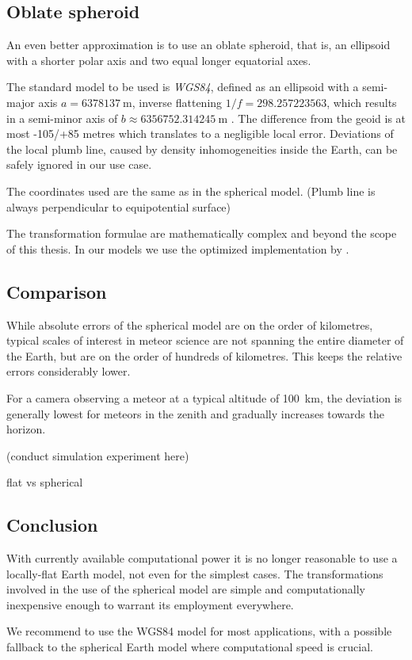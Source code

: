     \subsection{Oblate spheroid} \label{mmw}
        An even better approximation is to use an oblate spheroid,
        that is, an ellipsoid with a shorter polar axis and two
        equal longer equatorial axes.

        The standard model to be used is \emph{WGS84}, defined as an ellipsoid
        with a semi-major axis $a = \SI{6378137}{\metre}$, inverse flattening
        $1/f = \num{298.257223563}$, which results in a semi-minor axis of
        $b \approx \SI{6356752.314245}{\metre}$ \cite{???}.
        The difference from the geoid is at most -105/+85 metres \cite{???}
        which translates to a negligible local error.
        Deviations of the local plumb line, caused by density inhomogeneities
        inside the Earth, can be safely ignored in our use case.

        The coordinates used are the same as in the spherical model. (Plumb line is always perpendicular to equipotential surface)

        The transformation formulae are mathematically complex and beyond the scope of this thesis.
        In our models we use the optimized implementation by \citet{osen2017}.

    \subsection{Comparison} \label{mmc}
        While absolute errors of the spherical model are on the order of kilometres,
        typical scales of interest in meteor science are not spanning the entire diameter of the Earth,
        but are on the order of hundreds of kilometres. This keeps the relative errors considerably lower.

        For a camera observing a meteor at a typical altitude of \SI{100}{\kilo\metre},
        the deviation is generally lowest for meteors in the zenith
        and gradually increases towards the horizon.

        (conduct simulation experiment here)

        flat vs spherical

    \subsection{Conclusion}
        With currently available computational power it is no longer reasonable to
        use a locally-flat Earth model, not even for the simplest cases.
        The transformations involved in the use of the spherical model
        are simple and computationally inexpensive enough to warrant its employment everywhere.

        We recommend to use the WGS84 model for most applications, with a possible
        fallback to the spherical Earth model where computational speed is crucial.
